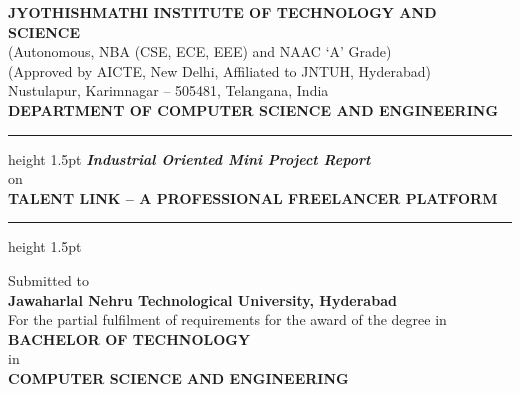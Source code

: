 \documentclass[12pt,a4paper,oneside]{report}
\numberwithin{figure}{chapter}
\numberwithin{table}{chapter}
\begin{document}

\setcounter{page}{1}

\thispagestyle{empty}
\begin{titlepage}
  \centering
  \vspace*{0.3cm}


  {\fontsize{16}{20}\selectfont\bfseries
    JYOTHISHMATHI INSTITUTE OF TECHNOLOGY AND SCIENCE}\\[0.1cm]
  {\fontsize{12}{16}\selectfont
    (Autonomous, NBA (CSE, ECE, EEE) and NAAC `A' Grade)\\
    (Approved by AICTE, New Delhi, Affiliated to JNTUH, Hyderabad)\\
    Nustulapur, Karimnagar -- 505481, Telangana, India}\\[0.5cm]

  {\fontsize{14}{18}\selectfont\bfseries
    DEPARTMENT OF COMPUTER SCIENCE AND ENGINEERING}\\[0.8cm]

  \hrule height 1.5pt
  \vspace{0.3cm}
  {\fontsize{14}{18}\selectfont\bfseries\itshape
    Industrial Oriented Mini Project Report}\\[0.1cm]
  {\fontsize{14}{18}\selectfont on}\\[0.3cm]
  {\fontsize{16}{20}\selectfont\bfseries
    TALENT LINK -- A PROFESSIONAL FREELANCER PLATFORM}\\[0.3cm]
  \hrule height 1.5pt
  \vspace{0.6cm}

  {\fontsize{12}{16}\selectfont
    Submitted to\\[0.2cm]
    {\bfseries Jawaharlal Nehru Technological University, Hyderabad}\\[0.2cm]
    For the partial fulfilment of requirements for the award of the degree in\\[0.2cm]
    {\bfseries BACHELOR OF TECHNOLOGY}\\[0.1cm]
    in\\[0.1cm]
    {\bfseries COMPUTER SCIENCE AND ENGINEERING}}\\[0.8cm]


\end{titlepage}
\end{document}
